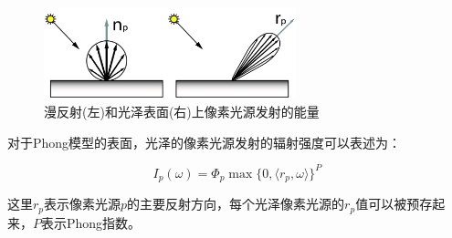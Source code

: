 \begin{figure}
	\sidecaption
	\includegraphics[width=0.65\textwidth]{figures/ir/ir-3-2}
	\caption{漫反射(左)和光泽表面(右)上像素光源发射的能量}
	\label{f:ir-glossy-pixel-light}
\end{figure}

对于Phong模型的表面，光泽的像素光源发射的辐射强度可以表述为：

\begin{equation}\label{e:ir-phong-radiant-intensity}
	I_p(\omega)=\Phi_p \max\{ 0,\langle r_p,\omega\rangle \}^{P}
\end{equation}

\noindent 这里$r_p$表示像素光源$p$的主要反射方向，每个光泽像素光源的$r_p$值可以被预存起来，$P$表示Phong指数。

